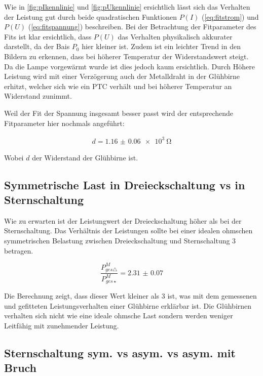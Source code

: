 \documentclass[12pt,english,ngerman]{scrartcl}
\begin{document}
Wie in \autoref{fig:pIkennlinie} und \autoref{fig:pUkennlinie} ersichtlich
lässt sich das Verhalten der Leistung gut durch beide quadratischen Funktionen
$P(I)$ (\autoref{eq:fitstrom}) und $P(U)$ (\autoref{eq:fitspannung})
beschreiben. Bei der Betrachtung der Fitparameter des Fits ist klar
ersichtlich, dass $P(U)$ das Verhalten physikalisch akkurater darstellt, da der
Bais $P_0$ hier kleiner ist. Zudem ist ein leichter Trend in den Bildern zu
erkennen, dass bei höherer Temperatur der Widerstandswert steigt. Da die Lampe
vorgewärmt wurde ist dies jedoch kaum ersichtlich. Durch Höhere Leistung wird
mit einer Verzögerung auch der Metalldraht in der Glühbirne erhitzt, welcher
sich wie ein PTC verhält und bei höherer Temperatur an Widerstand zunimmt.

Weil der Fit der Spannung insgesamt besser passt wird der entsprechende
Fitparameter hier nochmals angeführt:

\begin{align}
	d = \SI{1.16(6)e3}{\ohm}
\end{align}

Wobei $d$ der Widerstand der Glühbirne ist.

\subsection{Symmetrische Last in Dreieckschaltung vs in Sternschaltung}

Wie zu erwarten ist der Leistungwert der Dreieckschaltung höher als bei der
Sternschaltung. Das Verhältnis der Leistungen sollte bei einer idealen ohmschen
symmetrischen Belastung zwischen Dreieckschaltung und Sternschaltung 3
betragen.

\begin{equation}
	\frac{P_{ges\triangle}^M}{P_{ges\star}^M} = \num{2.31(7)}
\end{equation}

Die Berechnung zeigt, dass dieser Wert kleiner als 3 ist, was mit dem
gemessenen und gefitteten Leistungsverhalten einer Glühbirne erklärbar ist. Die
Glühbirnen verhalten sich nicht wie eine ideale ohmsche Last sondern werden
weniger Leitfähig mit zunehmender Leistung.

\subsection{Sternschaltung sym. vs asym. vs asym. mit Bruch}
\end{document}
